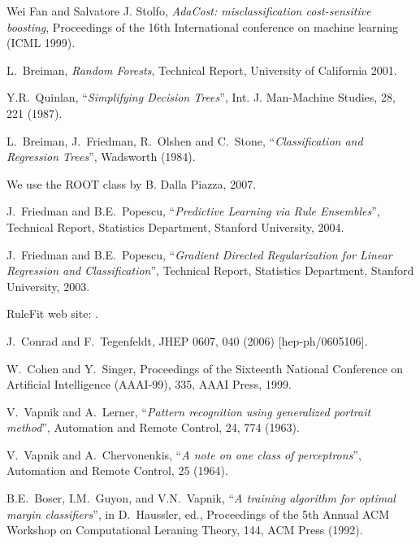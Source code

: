 \begin{thebibliography}{99}
 Wei Fan and Salvatore J. Stolfo, {\em AdaCost: misclassification cost-sensitive boosting}, Proceedings of the 16th International conference on machine learning (ICML 1999).

   L.~Breiman, {\em Random Forests}, Technical Report, University of California 2001.


       Y.R.~Quinlan, ``{\em Simplifying Decision Trees}'',
                        Int. J. Man-Machine Studies, 28, 221 (1987).

   L.~Breiman, J.~Friedman, R.~Olshen and C.~Stone, 
                        ``{\em Classification and Regression Trees}'',
                        Wadsworth (1984).

  We use the ROOT class  by B. Dalla Piazza, 2007.

 	   J.~Friedman and B.E.~Popescu, 
								``{\em Predictive Learning via Rule Ensembles}'', 
                        Technical Report, Statistics Department, Stanford University, 2004.

    J.~Friedman and B.E.~Popescu, 
								``{\em Gradient Directed Regularization for Linear 
                          Regression and Classification}'', 
                        Technical Report, Statistics Department, Stanford University, 2003.

    RuleFit web site:
                        .

	   J.~Conrad and F.~Tegenfeldt,
                        JHEP 0607, 040 (2006) [hep-ph/0605106].

	      W.~Cohen and Y.~Singer,
			               Proceedings of the Sixteenth National Conference on Artificial 
                        Intelligence (AAAI-99), 335, AAAI Press, 1999.

   V.~Vapnik and A.~Lerner, 
                       ``{\em Pattern recognition using generalized portrait method}'',
                       Automation and Remote Control, 24, 774 (1963). 

   V.~Vapnik and A.~Chervonenkis,
                       ``{\em A note on one class of perceptrons}'',
                       Automation and Remote Control, 25 (1964).

   B.E.~Boser, I.M.~Guyon, and V.N.~Vapnik, 
                       ``{\em A training algorithm for optimal margin classifiers}'', 
                       in D.~Haussler, ed., Proceedings of the 5th Annual ACM Workshop 
                       on Computational Leraning Theory, 144, ACM Press (1992). 


\end{thebibliography}
